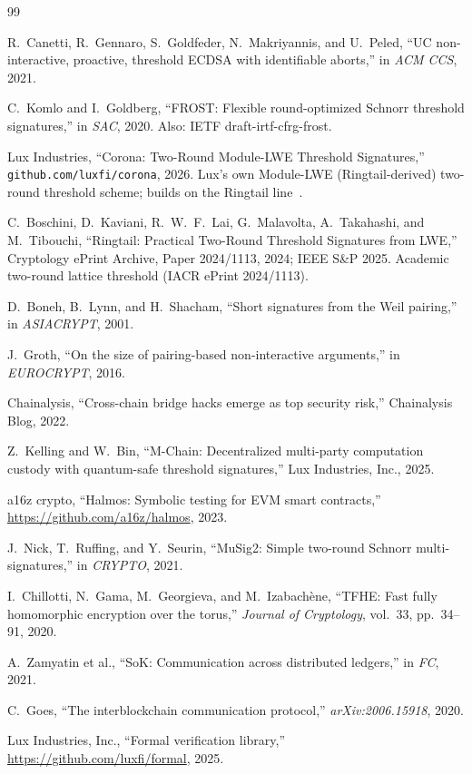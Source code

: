 \begin{thebibliography}{99}

R.~Canetti, R.~Gennaro, S.~Goldfeder, N.~Makriyannis, and U.~Peled,
``UC non-interactive, proactive, threshold ECDSA with identifiable aborts,''
in \emph{ACM CCS}, 2021.

C.~Komlo and I.~Goldberg,
``FROST: Flexible round-optimized Schnorr threshold signatures,''
in \emph{SAC}, 2020.
Also: IETF draft-irtf-cfrg-frost.

{Lux Industries},
``Corona: Two-Round Module-LWE Threshold Signatures,''
\texttt{github.com/luxfi/corona}, 2026.
Lux's own Module-LWE (Ringtail-derived) two-round threshold scheme;
builds on the Ringtail line~\cite{ringtail}.

C.~Boschini, D.~Kaviani, R.~W.~F.~Lai, G.~Malavolta, A.~Takahashi, and
M.~Tibouchi,
``Ringtail: Practical Two-Round Threshold Signatures from LWE,''
Cryptology ePrint Archive, Paper 2024/1113, 2024; IEEE S\&P 2025.
Academic two-round lattice threshold (IACR ePrint 2024/1113).

D.~Boneh, B.~Lynn, and H.~Shacham,
``Short signatures from the Weil pairing,''
in \emph{ASIACRYPT}, 2001.

J.~Groth,
``On the size of pairing-based non-interactive arguments,''
in \emph{EUROCRYPT}, 2016.

Chainalysis,
``Cross-chain bridge hacks emerge as top security risk,''
Chainalysis Blog, 2022.

Z.~Kelling and W.~Bin,
``M-Chain: Decentralized multi-party computation custody with quantum-safe threshold signatures,''
Lux Industries, Inc., 2025.

a16z crypto,
``Halmos: Symbolic testing for EVM smart contracts,''
\url{https://github.com/a16z/halmos}, 2023.

J.~Nick, T.~Ruffing, and Y.~Seurin,
``MuSig2: Simple two-round Schnorr multi-signatures,''
in \emph{CRYPTO}, 2021.

I.~Chillotti, N.~Gama, M.~Georgieva, and M.~Izabach\`{e}ne,
``TFHE: Fast fully homomorphic encryption over the torus,''
\emph{Journal of Cryptology}, vol.~33, pp.~34--91, 2020.

A.~Zamyatin et al.,
``SoK: Communication across distributed ledgers,''
in \emph{FC}, 2021.

C.~Goes,
``The interblockchain communication protocol,''
\emph{arXiv:2006.15918}, 2020.

Lux Industries, Inc.,
``Formal verification library,''
\url{https://github.com/luxfi/formal}, 2025.

\end{thebibliography}

